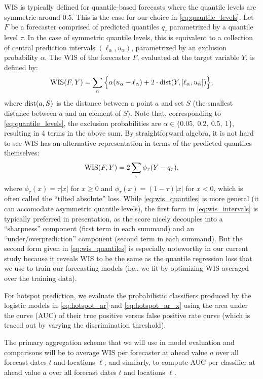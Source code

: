 \documentclass[9pt,twocolumn,twoside,lineno]{pnas-new}
\begin{document}
WIS is typically defined for quantile-based forecasts where the quantile levels
are symmetric around 0.5.  This is the case for our choice in
\eqref{eq:quantile_levels}.  Let $F$ be a forecaster comprised of predicted
quantiles $q_\tau$ parametrized by a quantile level $\tau$.  In the case of
symmetric quantile levels, this is equivalent to a collection of central
prediction intervals $(\ell_\alpha, u_\alpha)$, parametrized by an exclusion
probability $\alpha$. The WIS of the forecaster $F$, evaluated at the target
variable $Y$, is defined by:
\begin{equation}
\label{eq:wis_intervals}
\mathrm{WIS}(F,Y) = \sum_\alpha \Big\{\alpha(u_\alpha - \ell_\alpha) + 2 \cdot
\mathrm{dist}(Y, [\ell_\alpha, u_\alpha])\Big\},  
\end{equation}
where $\mathrm{dist}(a, S)$ is the distance between a point $a$ and set $S$ (the
smallest distance between $a$ and an element of $S$).  Note that, corresponding  
to \eqref{eq:quantile_levels}, the exclusion probabilities are $\alpha \in
\{0.05,\ 0.2,\ 0.5,\ 1\}$, resulting in 4 terms in the above sum.  By 
straightforward algebra, it is not hard to see WIS has an alternative 
representation in terms of the predicted quantiles themselves:
\begin{equation}
\label{eq:wis_quantiles}
\mathrm{WIS}(F,Y) = 2 \sum_\tau \phi_\tau(Y - q_\tau), 
\end{equation}
where $\phi_\tau(x) = \tau |x|$ for $x \geq 0$ and $\phi_\tau(x) = (1-\tau)
|x|$ for $x<0$, which is often called the ``tilted absolute'' loss.  While
\eqref{eq:wis_quantiles} is more general (it can accomodate asymmetric quantile
levels), the first form in \eqref{eq:wis_intervals} is typically preferred in
presentation, as the score nicely decouples into a ``sharpness'' component
(first term in each summand) and an ``under/overprediction'' component (second
term in each summand).  But the second form given in \eqref{eq:wis_quantiles} is 
especially noteworthy in our current study because it reveals WIS to be the same
as the quantile regression loss that we use to train our forecasting models
(i.e., we fit by optimizing WIS averaged over the training data).

For hotspot prediction, we evaluate the probabilistic classifiers produced by
the logistic models in \eqref{eq:hotspot_ar} and \eqref{eq:hotspot_ar_x} using
the area under the curve (AUC) of their true positive versus false positive rate 
curve (which is traced out by varying the discrimination threshold). 

The primary aggregation scheme that we will use in model evaluation and
comparisons will be to average WIS per forecaster at ahead value $a$ over all
forecast dates $t$ and locations $\ell$; and similarly, to compute AUC per
classifier at ahead value $a$ over all forecast dates $t$ and locations
$\ell$.
\end{document}
